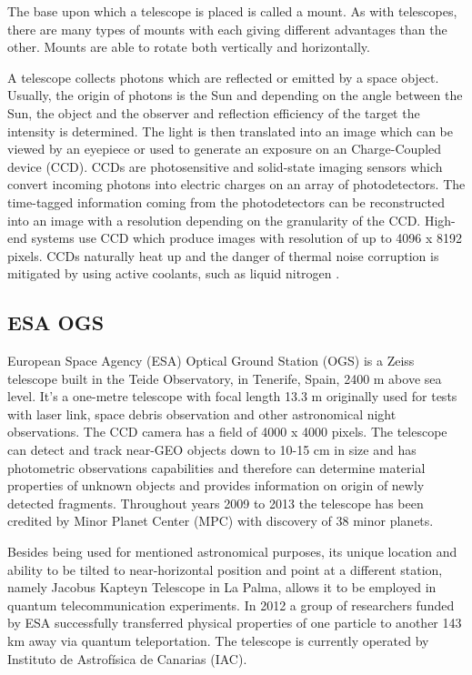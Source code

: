 	The base upon which a telescope is placed is called a mount. As with telescopes, there are many types of mounts with each giving different advantages than the other. Mounts are able to rotate both vertically and horizontally.
	
	A telescope collects photons which are reflected or emitted by a space object. Usually, the origin of photons is the Sun and depending on the angle between the Sun, the object and the observer and reflection efficiency of the target the intensity is determined. The light is then translated into an image which can be viewed by an eyepiece or used to generate an exposure on an Charge-Coupled device (CCD). CCDs are photosensitive and solid-state imaging sensors which convert incoming photons into electric charges on an array of photodetectors. The time-tagged information coming from the photodetectors can be reconstructed into an image with a resolution depending on the granularity of the CCD. High-end systems use CCD which produce images with resolution of up to 4096 x 8192 pixels. CCDs naturally heat up and the danger of thermal noise corruption is mitigated by using active coolants, such as liquid nitrogen \citep{klinkrad2006space}.

\subsection{ESA OGS}\label{subsec:esa_ogs}
European Space Agency (ESA) Optical Ground Station (OGS) is a Zeiss telescope built in the Teide Observatory, in Tenerife, Spain, 2400 m above sea level. It’s a one-metre telescope with focal length 13.3 m originally used for tests with laser link, space debris observation and other astronomical night observations. The CCD camera has a field of 4000 x 4000 pixels. The telescope can detect and track near-GEO objects down to 10-15 cm in size and has photometric observations capabilities and therefore can determine material properties of unknown objects and provides information on origin of newly detected fragments. Throughout years 2009 to 2013 the telescope has been credited by Minor Planet Center (MPC) with discovery of 38 minor planets.
 
	Besides being used for mentioned astronomical purposes, its unique location and ability to be tilted to near-horizontal position and point at a different station, namely Jacobus Kapteyn Telescope in La Palma, allows it to be employed in quantum telecommunication experiments. In 2012 a group of researchers funded by ESA successfully transferred physical properties of one particle to another 143 km away via quantum teleportation. The telescope is currently operated by Instituto de Astrofísica de Canarias (IAC).


